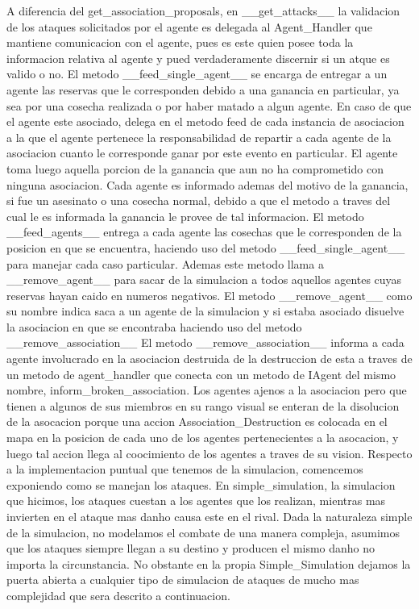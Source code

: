 \documentclass[11pt]{article}
\begin{document}
A diferencia del get_association_proposals, en __get_attacks__ la validacion de los ataques solicitados por el agente es delegada al Agent_Handler que mantiene comunicacion con el agente, pues es este quien posee toda la informacion relativa al agente y pued verdaderamente discernir si un atque es valido o no.
El metodo __feed_single_agent__ se encarga de entregar a un agente las reservas que le corresponden debido a una ganancia en particular, ya sea por una cosecha realizada o por haber matado a algun agente. En caso de que el agente este asociado, delega en el metodo feed de cada instancia de asociacion a la que el agente pertenece la responsabilidad de repartir a cada agente de la asociacion cuanto le corresponde ganar por este evento en particular. El agente toma luego aquella porcion de la ganancia que aun no ha comprometido con ninguna asociacion. Cada agente es informado ademas del motivo de la ganancia, si fue un asesinato o una cosecha normal, debido a que el metodo a traves del cual le es informada la ganancia le provee de tal informacion.
El metodo __feed_agents__ entrega a cada agente las cosechas que le corresponden de la posicion en que se encuentra, haciendo uso del metodo __feed_single_agent__ para manejar cada caso particular. Ademas este metodo llama a __remove_agent__ para sacar de la simulacion a todos aquellos agentes cuyas reservas hayan caido en numeros negativos.
El metodo __remove_agent__ como su nombre indica saca a un agente de la simulacion y si estaba asociado disuelve la asociacion en que se encontraba haciendo uso del metodo __remove_association__
El metodo __remove_association__ informa a cada agente involucrado en la asociacion destruida de la destruccion de esta a traves de un metodo de agent_handler que conecta con un metodo de IAgent del mismo nombre, inform_broken_association. Los agentes ajenos a la asociacion pero que tienen a algunos de sus miembros en su rango visual se enteran de la disolucion de la asocacion porque una accion Association_Destruction es colocada en el mapa en la posicion de cada uno de los agentes pertenecientes a la asocacion, y luego tal accion llega al coocimiento de los agentes a traves de su vision.
Respecto a la implementacion puntual que tenemos de la simulacion, comencemos exponiendo como se manejan los ataques.
En simple_simulation, la simulacion que hicimos, los ataques cuestan a los agentes que los realizan, mientras mas invierten en el ataque mas danho causa este en el rival. Dada la naturaleza simple de la simulacion, no modelamos el combate de una manera compleja, asumimos que los ataques siempre llegan a su destino y producen el mismo danho no importa la circunstancia. No obstante en la propia Simple_Simulation dejamos la puerta abierta a cualquier tipo de simulacion de ataques de mucho mas complejidad que sera descrito a continuacion.
\end{document}
